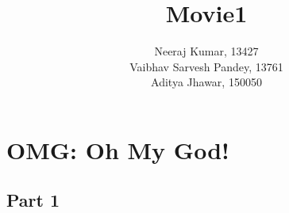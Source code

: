 \documentclass[a4paper]{article}
\title{Movie1 }
\author{Neeraj Kumar, 13427\\
	Vaibhav Sarvesh Pandey, 13761\\
	Aditya Jhawar, 150050}
\begin{document}
	\maketitle
	
	
	
	\section{OMG: Oh My God! }
	
	    \subsection{Part 1}
	    	        
	        
	            
	        
	        
	        
	    
	    
	

	
	
\end{document}
